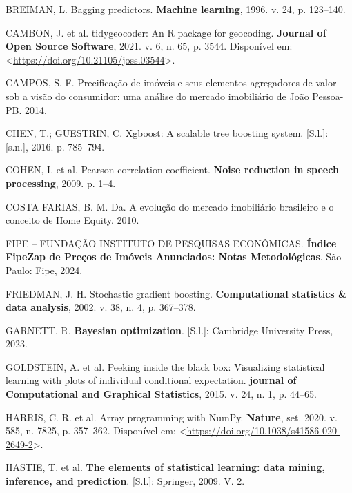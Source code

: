 \documentclass[
  12pt,
  a4paper,
]{scrreprt}
\newlength{\cslhangindent}
\newenvironment{CSLReferences}[2] %
 {\begin{list}{}{%
  \setlength{\itemindent}{0pt}
  \setlength{\leftmargin}{0pt}
  \setlength{\parsep}{0pt}
  \ifodd #1
   \setlength{\leftmargin}{\cslhangindent}
   \setlength{\itemindent}{-1\cslhangindent}
  \fi
  \setlength{\itemsep}{#2\baselineskip}}}
 {\end{list}}
\begin{document}
\begin{CSLReferences}{0}{1}
BREIMAN, L. Bagging predictors. \textbf{Machine learning}, 1996. v. 24,
p. 123--140.

CAMBON, J. et al. tidygeocoder: An R package for geocoding.
\textbf{Journal of Open Source Software}, 2021. v. 6, n. 65, p. 3544.
Disponível em:
\textless{}\url{https://doi.org/10.21105/joss.03544}\textgreater.

CAMPOS, S. F. Precifica{ç}{ã}o de im{ó}veis e seus elementos agregadores
de valor sob a vis{ã}o do consumidor: uma an{á}lise do mercado
imobili{á}rio de Jo{ã}o Pessoa-PB. 2014.

CHEN, T.; GUESTRIN, C. Xgboost: A scalable tree boosting system.
{[}S.l.{]}: {[}s.n.{]}, 2016. p. 785--794.

COHEN, I. et al. Pearson correlation coefficient. \textbf{Noise
reduction in speech processing}, 2009. p. 1--4.

COSTA FARIAS, B. M. Da. A evolu{ç}{ã}o do mercado imobili{á}rio
brasileiro e o conceito de Home Equity. 2010.

FIPE -- FUNDAÇÃO INSTITUTO DE PESQUISAS ECONÔMICAS. \textbf{Índice
FipeZap de Preços de Imóveis Anunciados: Notas Metodológicas}. São
Paulo: Fipe, 2024.

FRIEDMAN, J. H. Stochastic gradient boosting. \textbf{Computational
statistics \& data analysis}, 2002. v. 38, n. 4, p. 367--378.

GARNETT, R. \textbf{Bayesian optimization}. {[}S.l.{]}: Cambridge
University Press, 2023.

GOLDSTEIN, A. et al. Peeking inside the black box: Visualizing
statistical learning with plots of individual conditional expectation.
\textbf{journal of Computational and Graphical Statistics}, 2015. v. 24,
n. 1, p. 44--65.

HARRIS, C. R. et al. Array programming with {NumPy}. \textbf{Nature},
set. 2020. v. 585, n. 7825, p. 357--362. Disponível em:
\textless{}\url{https://doi.org/10.1038/s41586-020-2649-2}\textgreater.

HASTIE, T. et al. \textbf{The elements of statistical learning: data
mining, inference, and prediction}. {[}S.l.{]}: Springer, 2009. V. 2.


\end{CSLReferences}
\end{document}
